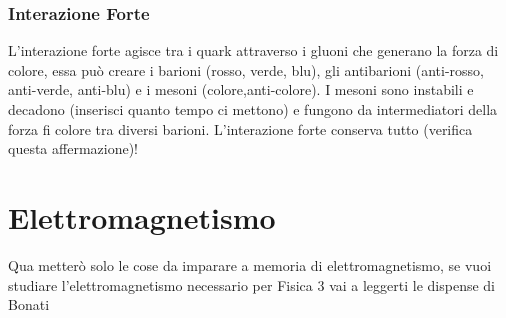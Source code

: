 \documentclass[11pt,a4paper]{report}
\begin{document}
	\subsection{Interazione Forte}
		L'interazione forte agisce tra i quark attraverso i gluoni che generano la forza di colore, essa può creare i barioni (rosso, verde, blu), gli antibarioni (anti-rosso, anti-verde, anti-blu) e i mesoni (colore,anti-colore).\newline
		I mesoni sono instabili e decadono (inserisci quanto tempo ci mettono) e fungono da intermediatori della forza fi colore tra diversi barioni.\newline
		L'interazione forte conserva tutto (verifica questa affermazione)!












\chapter{Elettromagnetismo}
	Qua metterò solo le cose da imparare a memoria di elettromagnetismo, se vuoi studiare l'elettromagnetismo necessario per Fisica 3 vai a leggerti le dispense di Bonati
\end{document}
